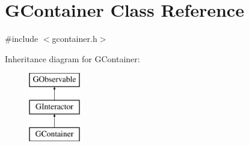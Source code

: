 \hypertarget{classGContainer}{}\section{G\+Container Class Reference}
\label{classGContainer}


{\ttfamily \#include $<$gcontainer.\+h$>$}

Inheritance diagram for G\+Container\+:\begin{figure}[H]
\begin{center}
\leavevmode
\includegraphics[height=3.000000cm]{classGContainer}
\end{center}
\end{figure}

